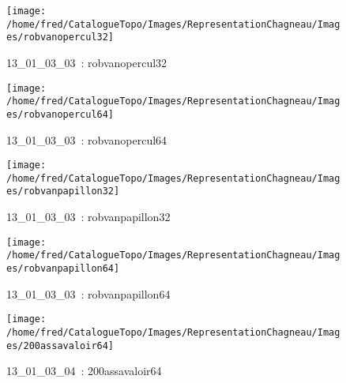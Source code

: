 \documentclass[12pt,titlepage]{book}
\begin{document}
\begin{figure}[h!]
  \begin{minipage}[t]{3cm}
    \begin{center}
      \texttt{[image: /home/fred/CatalogueTopo/Images/RepresentationChagneau/Images/robvanopercul32]}
      \caption[~13\_01\_03\_03]{\small{13\_01\_03\_03~:} \tiny{robvanopercul32}}\label{robvanopercul32}
    \end{center}
  \end{minipage}
  \begin{minipage}[t]{3cm}
    \begin{center}
      \texttt{[image: /home/fred/CatalogueTopo/Images/RepresentationChagneau/Images/robvanopercul64]}
      \caption[~13\_01\_03\_03]{\small{13\_01\_03\_03~:} \tiny{robvanopercul64}}\label{robvanopercul64}
    \end{center}
  \end{minipage}
  \begin{minipage}[t]{3cm}
    \begin{center}
      \texttt{[image: /home/fred/CatalogueTopo/Images/RepresentationChagneau/Images/robvanpapillon32]}
      \caption[~13\_01\_03\_03]{\small{13\_01\_03\_03~:} \tiny{robvanpapillon32}}\label{robvanpapillon32}
    \end{center}
  \end{minipage}
  \begin{minipage}[t]{3cm}
    \begin{center}
      \texttt{[image: /home/fred/CatalogueTopo/Images/RepresentationChagneau/Images/robvanpapillon64]}
      \caption[~13\_01\_03\_03]{\small{13\_01\_03\_03~:} \tiny{robvanpapillon64}}\label{robvanpapillon64}
    \end{center}
  \end{minipage}
  \begin{minipage}[t]{3cm}
    \begin{center}
      \texttt{[image: /home/fred/CatalogueTopo/Images/RepresentationChagneau/Images/200assavaloir64]}
      \caption[~13\_01\_03\_04]{\small{13\_01\_03\_04~:} \tiny{200assavaloir64}}\label{200assavaloir64}
    \end{center}
  \end{minipage}
  \begin{minipage}[t]{3cm}
    \begin{center}

\end{center}
\end{minipage}
\end{figure}
\end{document}
